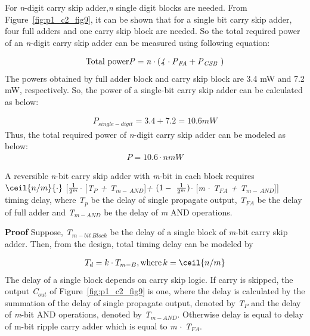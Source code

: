 For {\it n}-digit carry skip adder,{\it n} single digit blocks are needed. From Figure~\ref{fig:p1_c2_fig9}, it can be shown that for a single bit carry skip adder, four full adders and one carry skip block are needed. So the total required power of an {\it n}-digit carry skip adder can be measured using following equation:

\begin{align*}
	\textnormal{Total power} {\it P = n \cdot (4 \cdot P{}_{FA}+ P{}_{CSB\ })}
\end{align*}
\textnormal{
The powers obtained by full adder block and carry skip block are { 3.4 mW} and {7.2 mW}, respectively. So, the power of a single-bit carry skip adder can be calculated as below:}

\begin{align*}
P{}_{single-digit} = 3.4 +7.2  = 10.6 mW
\end{align*}
\textnormal{
Thus, the total required power of {\it n}-digit carry skip adder can be modeled as below:}
\begin{align*}
P = 10.6 \cdot n mW
\end{align*}

\begin{property}\textnormal{
	A reversible {\it n}-bit carry skip adder with {\it m}-bit in each block requires $\ceil{n/m}{\cdot}$ [${{1}\over {2^m}}${\it  $\cdot$ }[{\it T${}_{P}$ +  T${}_{m-\ AND}$}]{\it  + }$(1-\ {{1}\over {2^m}})${\it $\cdot$ }[{\it m $\cdot$ T${}_{FA}$ + T${}_{m-\ AND}$}]] timing delay, where {\it T${}_{p}$} be the delay of single propagate output, {\it T${}_{FA}$} be the delay of full adder and {\it T${}_{m-AND}$} be the delay of {\it m} AND operations.}
\end{property}

\noindent\textbf{Proof}\textnormal{
	Suppose, {\it T${}_{m-bit\ Block}$} be the delay of a single block of {\it m}-bit carry skip adder. Then, from the design, total timing delay can be modeled by}
	
	\begin{align*}
	T_{d} = k \cdot T_{m-B}, \textnormal{where} \, k=\ceil{n/m}
	\end{align*}
\textnormal{	
The delay of a single block depends on carry skip logic. If carry is skipped, the output {\it C${}_{out}$} of Figure~\ref{fig:p1_c2_fig9} is one, where the delay is calculated by the summation of the delay of single propagate output, denoted by {\it T${}_{P}$} and the delay of {\it m}-bit AND operations, denoted by {\it T${}_{m-AND}$}. Otherwise delay is equal to delay of m-bit ripple carry adder which is equal to {\it m $\cdot$ T${}_{FA}$}.}

